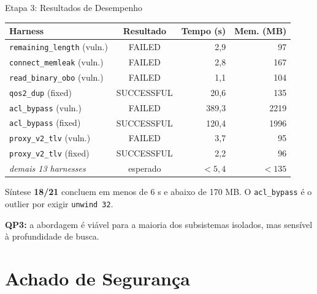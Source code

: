 \documentclass[10pt,aspectratio=169]{beamer}
\begin{document}
\begin{frame}{Etapa 3: Resultados de Desempenho}
    \small
    \begin{tabular}{lcrr}
        \toprule
        Harness & Resultado & Tempo (s) & Mem. (MB) \\
        \midrule
        \texttt{remaining\_length} (vuln.)   & FAILED     &   2,9 &   97 \\
        \texttt{connect\_memleak} (vuln.)    & FAILED     &   2,8 &  167 \\
        \texttt{read\_binary\_obo} (vuln.)   & FAILED     &   1,1 &  104 \\
        \texttt{qos2\_dup} (fixed)           & SUCCESSFUL &  20,6 &  135 \\
        \texttt{acl\_bypass} (vuln.)         & FAILED     & 389,3 & 2219 \\
        \texttt{acl\_bypass} (fixed)         & SUCCESSFUL & 120,4 & 1996 \\
        \texttt{proxy\_v2\_tlv} (vuln.)      & FAILED     &   3,7 &   95 \\
        \texttt{proxy\_v2\_tlv} (fixed)      & SUCCESSFUL &   2,2 &   96 \\
        \emph{demais 13 harnesses}            & esperado   & $<5,4$ & $<135$ \\
        \bottomrule
    \end{tabular}

    \vspace{0.5em}
    \begin{block}{S\'intese}
        \textbf{18/21} concluem em menos de 6 s e abaixo de 170 MB.
        O \texttt{acl\_bypass} \'e o outlier por exigir \texttt{unwind 32}.
    \end{block}
    \footnotesize \textbf{QP3:} a abordagem \'e vi\'avel para a maioria dos
    subsistemas isolados, mas sens\'ivel \`a profundidade de busca.
\end{frame}

\section{Achado de Seguran\c{c}a}
\end{document}
